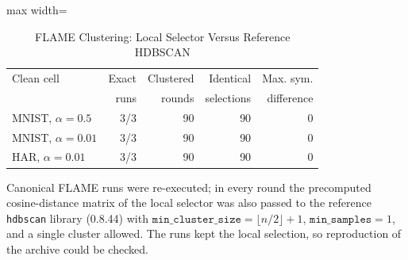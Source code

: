 \begin{table}[!t]
\centering\footnotesize
\setlength{\tabcolsep}{4pt}
\caption{FLAME Clustering: Local Selector Versus Reference HDBSCAN}\label{tab:review_e2}
\begin{adjustbox}{max width=\columnwidth}
\begin{tabular}{lrrrr}
\toprule
Clean cell & Exact & Clustered & Identical & Max. sym. \\
 & runs & rounds & selections & difference \\
\midrule
MNIST, $\alpha=0.5$ & 3/3 & 90 & 90 & 0 \\
MNIST, $\alpha=0.01$ & 3/3 & 90 & 90 & 0 \\
HAR, $\alpha=0.01$ & 3/3 & 90 & 90 & 0 \\
\bottomrule
\end{tabular}
\end{adjustbox}

\par\vspace{3pt}\parbox{\linewidth}{\footnotesize Canonical FLAME runs were re-executed; in every round the precomputed cosine-distance matrix of the local selector was also passed to the reference \texttt{hdbscan} library (0.8.44) with $\texttt{min\_cluster\_size}=\lfloor n/2\rfloor+1$, $\texttt{min\_samples}=1$, and a single cluster allowed. The runs kept the local selection, so reproduction of the archive could be checked.}
\end{table}
